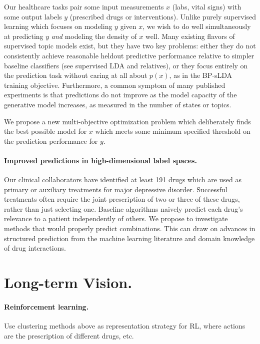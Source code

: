 \documentclass[11pt,letterpaper,sans]{article}
\begin{document}
Our healthcare tasks pair some input measurements $x$ (labs, vital signs) with some output labels $y$ (prescribed drugs or interventions).
Unlike purely supervised learning which focuses on modeling $y$ given $x$, we wish to do well simultaneously at predicting $y$ \emph{and} modeling the density of $x$ well.
Many existing flavors of supervised topic models exist, but they have two key problems: either they do not consistently achieve reasonable heldout predictive performance relative to simpler baseline classifiers (see supervised LDA \citep{blei2007sLDA} and relatives), or they focus entirely on the prediction task without caring at all about $p(x)$, as in the BP-sLDA~\citep{chen2015bplda} training objective. Furthermore, a common symptom of many published experiments is that predictions do not improve as the model capacity of the generative model increases, as measured in the number of states or topics.

We propose a new multi-objective optimization problem which deliberately finds the best possible model for $x$ which meets some minimum specified threshold on the prediction performance for $y$.

\paragraph{Improved predictions in high-dimensional label spaces.}
Our clinical collaborators have identified at least 191 drugs which are used as primary or auxiliary treatments for major depressive disorder. Successful treatments often require the joint prescription of two or three of these drugs, rather than just selecting one. 
Baseline algorithms naively predict each drug's relevance to a patient independently of others.
We propose to investigate methods that would properly predict combinations. This can draw on advances in structured prediction from the machine learning literature and domain knowledge of drug interactions.


\section{Long-term Vision.}
\paragraph{Reinforcement learning.}
Use clustering methods above as representation strategy for RL, where actions are the prescription of different drugs, etc. 
\end{document}
